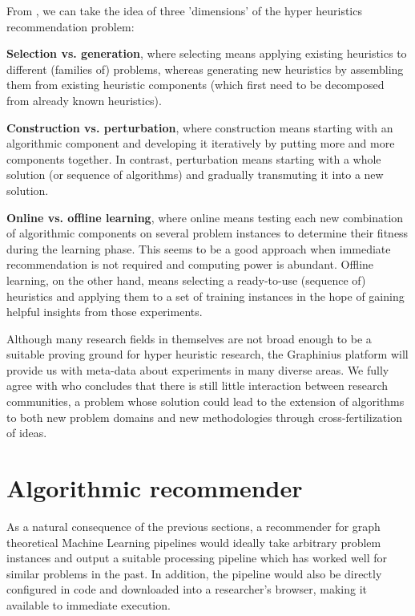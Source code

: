 From \citep{Burke2010}, we can take the idea of three 'dimensions' of the hyper heuristics recommendation problem:

\textbf{Selection vs. generation}, where selecting means applying existing heuristics to different (families of) problems, whereas generating new heuristics by assembling them from existing heuristic components (which first need to be decomposed from already known heuristics).

\textbf{Construction vs. perturbation}, where construction means starting with an algorithmic component and developing it iteratively by putting more and more components together. In contrast, perturbation means starting with a whole solution (or sequence of algorithms) and gradually transmuting it into a new solution.

\textbf{Online vs. offline learning}, where online means testing each new combination of algorithmic components on several problem instances to determine their fitness during the learning phase. This seems to be a good approach when immediate recommendation is not required and computing power is abundant. Offline learning, on the other hand, means selecting a ready-to-use (sequence of) heuristics and applying them to a set of training instances in the hope of gaining helpful insights from those experiments.

Although many research fields in themselves are not broad enough to be a suitable proving ground for hyper heuristic research, the Graphinius platform will provide us with meta-data about experiments in many diverse areas. We fully agree with \cite{Burke2013} who concludes that there is still little interaction between research communities, a problem whose solution could lead to the extension of algorithms to both new problem domains and new methodologies through cross-fertilization of ideas.


\section{Algorithmic recommender}
\label{sect:algo_recommender}

As a natural consequence of the previous sections, a recommender for graph theoretical Machine Learning pipelines would ideally take arbitrary problem instances and output a suitable processing pipeline which has worked well for similar problems in the past. In addition, the pipeline would also be directly configured in code and downloaded into a researcher's browser, making it available to immediate execution.


